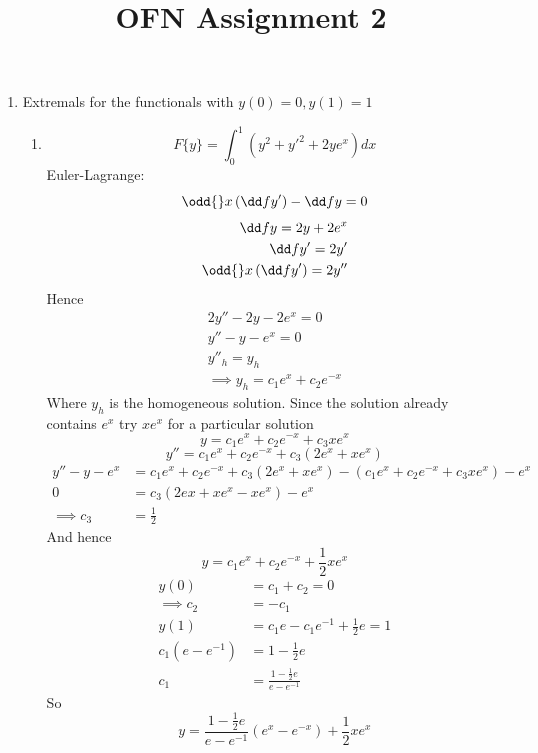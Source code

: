 \documentclass{X:/Documents/Coding/Latex/myassignment}
\title{OFN Assignment 2}
\begin{document}

\maketitle

\begin{enumerate}
\item Extremals for the functionals with $y(0) = 0, y(1) = 1$
\begin{enumerate}
	\item 
	\[F\{y\} = \int_0^1 \left(y^2 + y'^2 + 2ye^x\right) dx\]
	Euler-Lagrange:
	\[\odd{}x \left(\dd f{y'}\right)-\dd fy  =0\]
	\begin{align*}
		\dd fy = 2y + 2e^{x}\\
		\dd f{y'} = 2y'\\
		\odd{}x \left(\dd f{y'}\right) = 2y''
	\end{align*}
	Hence
	\begin{align*}
		2y'' - 2y - 2e^{x} = 0\\
		y'' - y - e^{x} = 0\\
		y''_{h} = y_{h}\\
		\implies y_{h} = c_1 e^{x} + c_2e^{-x}   
	\end{align*}
	Where $y_h$ is the homogeneous solution. Since the solution already contains $e^{x}$ try $xe^{x}$ for a particular solution
	\[y = c_1e^{x} + c_2e^{-x} + c_3 x e^{x}\]
	\[y'' = c_1 e^{x} + c_2 e^{-x} + c_3 (2e^{x} + xe^{x})\]
	\begin{align*}
		y'' - y - e^{x} &=c_1 e^{x} + c_2 e^{-x} + c_3 (2e^{x} + xe^{x}) -\left(c_1e^{x} + c_2e^{-x} + c_3 x e^{x}\right) - e^{x}\\
		0&= c_3\left(2e{x} + xe^{x} - xe^{x}\right) - e^{x}\\
		\implies  c_3 &= \frac12
	\end{align*}
	And hence
	\[y = c_1 e^{x} + c_2 e^{-x} + \frac12 xe^{x}\]
	\begin{align*}
		y(0) &= c_1 + c_2 = 0\\
		\implies c_2 &= -c_1\\
		y(1) &= c_1 e - c_1 e^{-1} + \frac12 e =1\\
		c_1(e-e^{-1}) &= 1 - \frac12 e\\
		c_1 &= \frac{1 - \frac12 e}{e - e^{-1}}
	\end{align*}
	So
	\[\boxed{y = \frac{1 - \frac12 e}{e - e^{-1}}\left(e^{x} - e^{-x}\right) + \frac12 xe^{x} }\]



\end{enumerate}
\end{enumerate}
\end{document}
